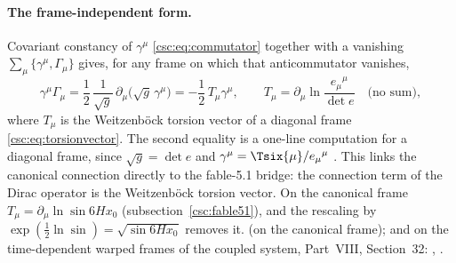 \paragraph{The frame-independent form.} Covariant constancy of $\gamma^\mu$
\eqref{csc:eq:commutator} together with a vanishing $\sum_\mu\{\gamma^\mu,\Gamma_\mu\}$ gives, for
any frame on which that anticommutator vanishes,
\begin{equation}
  \gamma^\mu\Gamma_\mu=\frac12\,\frac{1}{\sqrt g}\,\partial_\mu\bigl(\sqrt g\,\gamma^\mu\bigr)=-\frac12\,T_\mu\gamma^\mu,
  \qquad T_\mu=\partial_\mu\ln\frac{e_\mu{}^\mu}{\det e}\quad\text{(no sum)},
\end{equation}
where $T_\mu$ is the Weitzenb\"ock torsion vector of a diagonal frame \eqref{csc:eq:torsionvector}.
The second equality is a one-line computation for a diagonal frame, since $\sqrt g=\det e$ and
$\gamma^\mu=\Tsix{\mu}/e_\mu{}^\mu$ \cfderived. This links the canonical connection directly to the
fable-5.1 bridge: the connection term of the Dirac operator is the Weitzenb\"ock torsion vector. On
the canonical frame $T_\mu=\partial_\mu\ln\sin 6Hx_0$ (subsection~\ref{csc:fable51}), and the
rescaling by $\exp(\tfrac12\ln\sin)=\sqrt{\sin 6Hx_0}$ removes it. 
 (on the canonical frame); and on the time-dependent warped frames of the coupled system, Part~VIII, Section~32: , .

\label{sec:3.8.12.4}

